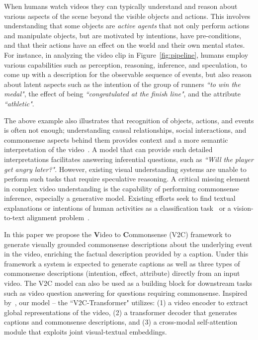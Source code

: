 When humans watch videos they can typically understand and reason about various aspects of the scene beyond the visible objects and actions.
This involves understanding that some objects are \textit{active agents} that not only perform actions and manipulate objects, but are motivated by intentions, have pre-conditions, and that their actions have an effect on the world and their own mental states.
For instance, in analyzing the video clip in Figure~\ref{fig:pipeline}, humans employ various capabilities such as perception, reasoning, inference, and speculation, to come up with a description for the observable sequence of events, but also reason about latent aspects such as the intention of the group of runners \textit{``to win the medal"}, the effect of being \textit{``congratulated at the finish line"}, and the attribute \textit{``athletic"}.

The above example also illustrates that recognition of objects, actions, and events is often not enough; understanding causal relationships, social interactions, and commonsense aspects behind them provides context and a more semantic interpretation of the video~\cite{gupta2009understanding}.
A model that can provide such detailed interpretations facilitates answering inferential questions, such as \textit{``Will the player get angry later?"}.
However, existing visual understanding systems are unable to perform such tasks that require speculative reasoning.
A critical missing element in complex video understanding is the capability of performing commonsense inference, especially a generative model.
Existing efforts seek to find textual explanations or intentions of human activities as a classification task~\cite{vondrick2016predicting} or a vision-to-text alignment problem~\cite{zhu2015aligning}.

In this paper we propose the \textbf{V}ideo to \textbf{C}ommonsense (V2C) framework to generate visually grounded commonsense descriptions about the underlying event in the video, enriching the factual description provided by a caption.
Under this framework a system is expected to generate captions as well as three types of commonsense descriptions (intention, effect, attribute) directly from an input video.
The V2C model can also be used as a building block for downstream tasks such as video question answering for questions requiring commonsense.
Inspired by~\citep{bosselut2019comet}, our model -- the ``V2C-Transformer" utilizes: (1) a video encoder to extract global representations of the video, (2) a transformer decoder that generates captions and commonsense descriptions, and (3) a cross-modal self-attention module that exploits joint visual-textual embeddings.

